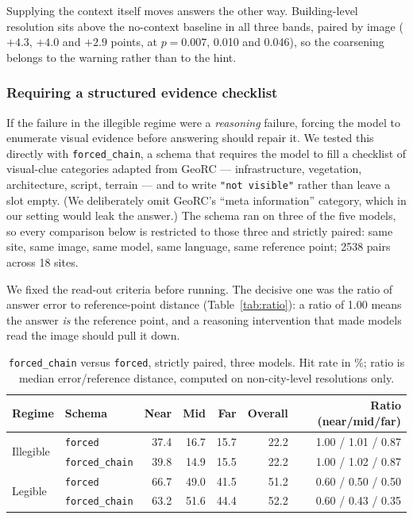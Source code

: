 \documentclass[10pt,a4paper]{article}
\begin{document}
Supplying the context itself moves answers the other way. Building-level
resolution sits above the no-context baseline in all three bands, paired by
image ($+\num{4.3}$, $+\num{4.0}$ and $+\num{2.9}$ points, at
$p=\num{0.007}$, \num{0.010} and \num{0.046}), so the coarsening belongs to the
warning rather than to the hint.

\subsubsection{Requiring a structured evidence checklist}
\label{sec:chain}

If the failure in the illegible regime were a \emph{reasoning} failure, forcing
the model to enumerate visual evidence before answering should repair it. We
tested this directly with \texttt{forced\_chain}, a schema that requires the
model to fill a checklist of visual-clue categories adapted from
GeoRC \citep{georc} --- infrastructure, vegetation, architecture, script,
terrain --- and to write \texttt{"not visible"} rather than leave a slot empty.
(We deliberately omit GeoRC's ``meta information'' category, which in our
setting would leak the answer.) The schema ran on three of the five models, so
every comparison below is restricted to those three and strictly paired: same
site, same image, same model, same language, same reference point;
\num{2538} pairs across \num{18} sites.

We fixed the read-out criteria before running. The decisive one was the ratio of
answer error to reference-point distance (Table~\ref{tab:ratio}): a ratio of
\num{1.00} means the answer \emph{is} the reference point, and a reasoning
intervention that made models read the image should pull it down.

\begin{table}[!htbp]
\centering
\caption{\texttt{forced\_chain} versus \texttt{forced}, strictly paired, three
models. Hit rate in \si{\percent}; ratio is median error/reference distance,
computed on non-city-level resolutions only.}
\label{tab:chain}
\begin{tabular}{llrrrrr}
\toprule
Regime & Schema & Near & Mid & Far & Overall & Ratio (near/mid/far) \\
\midrule
\multirow{2}{*}{Illegible}
 & \texttt{forced}        & 37.4 & 16.7 & 15.7 & 22.2 & 1.00 / 1.01 / 0.87 \\
 & \texttt{forced\_chain} & 39.8 & 14.9 & 15.5 & 22.2 & 1.00 / 1.02 / 0.87 \\
\midrule
\multirow{2}{*}{Legible}
 & \texttt{forced}        & 66.7 & 49.0 & 41.5 & 51.2 & 0.60 / 0.50 / 0.50 \\
 & \texttt{forced\_chain} & 63.2 & 51.6 & 44.4 & 52.2 & 0.60 / 0.43 / 0.35 \\
\bottomrule
\end{tabular}
\end{table}
\end{document}
